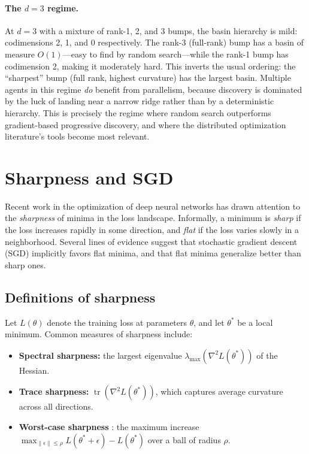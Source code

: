 \documentclass{article}
\begin{document}
\paragraph{The $d = 3$ regime.}
At $d = 3$ with a mixture of rank-1, 2, and 3 bumps, the basin
hierarchy is mild: codimensions 2, 1, and 0 respectively.  The rank-3
(full-rank) bump has a basin of measure $O(1)$---easy to find by random
search---while the rank-1 bump has codimension 2, making it moderately
hard.  This inverts the usual ordering: the ``sharpest'' bump (full
rank, highest curvature) has the largest basin.  Multiple agents in this
regime \emph{do} benefit from parallelism, because discovery is
dominated by the luck of landing near a narrow ridge rather than by a
deterministic hierarchy.  This is precisely the regime where random
search outperforms gradient-based progressive discovery, and where the
distributed optimization literature's tools become most relevant.

\section{Sharpness and SGD}

Recent work in the optimization of deep neural networks has drawn
attention to the \emph{sharpness} of minima in the loss landscape.
Informally, a minimum is \emph{sharp} if the loss increases rapidly in
some direction, and \emph{flat} if the loss varies slowly in a
neighborhood. Several lines of evidence suggest that stochastic gradient
descent (SGD) implicitly favors flat minima, and that flat minima
generalize better than sharp ones.

\subsection{Definitions of sharpness}

Let $L(\theta)$ denote the training loss at parameters $\theta$, and let
$\theta^*$ be a local minimum. Common measures of sharpness include:
\begin{itemize}
  \item \textbf{Spectral sharpness:} the largest eigenvalue
    $\lambda_{\max}(\nabla^2 L(\theta^*))$ of the Hessian.
  \item \textbf{Trace sharpness:} $\operatorname{tr}(\nabla^2 L(\theta^*))$,
    which captures average curvature across all directions.
  \item \textbf{Worst-case sharpness} \cite{keskar2017large}: the maximum
    increase $\max_{\|\epsilon\| \le \rho} L(\theta^* + \epsilon) - L(\theta^*)$
    over a ball of radius $\rho$.
\end{itemize}
\end{document}
